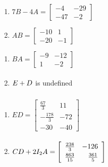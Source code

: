 \begin{multicols}{2} 
\begin{enumerate}
\setcounter{enumi}{\value{HW}}

\item $7B - 4A = \left[ \begin{array}{rr} -4 & -29 \\ -47 & -2 \end{array} \right]$
\item $AB = \left[ \begin{array}{rr} -10 & 1 \\ -20 & -1 \end{array} \right]$


\setcounter{HW}{\value{enumi}}
\end{enumerate}
\end{multicols}

\begin{multicols}{2} 
\begin{enumerate}
\setcounter{enumi}{\value{HW}}

\item $BA = \left[ \begin{array}{rr} -9 & -12 \\ 1 & -2 \end{array} \right]$
\item $E + D \vphantom{\left[ \begin{array}{rr} -9 & -12 \\ 1 & -2 \end{array} \right]}$ is undefined


\setcounter{HW}{\value{enumi}}
\end{enumerate}
\end{multicols}

\begin{multicols}{2} 
\begin{enumerate}
\setcounter{enumi}{\value{HW}}

\item $ED = \left[ \begin{array}{rr} \frac{67}{3}& 11 \\[3pt] -\frac{178}{3} & -72 \\ -30 & -40 \end{array} \right]$
\item $CD + 2I_{2}A = \left[ \begin{array}{rr} \frac{238}{3} & -126 \\[3pt] \frac{863}{15} & \frac{361}{5} \end{array} \right] \vphantom{\left[ \begin{array}{rr} \frac{67}{3}& 11 \\[3pt] -\frac{178}{3} & -72 \\ -30 & -40 \end{array} \right]}$


\setcounter{HW}{\value{enumi}}
\end{enumerate}
\end{multicols}

